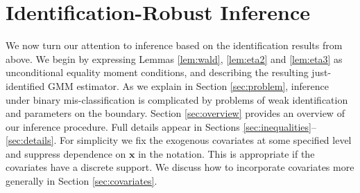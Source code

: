 \section{Identification-Robust Inference}
\label{sec:inference}
We now turn our attention to inference based on the identification results from above.
We begin by expressing Lemmas \ref{lem:wald}, \ref{lem:eta2} and \ref{lem:eta3} as unconditional equality moment conditions, and describing the resulting just-identified GMM estimator. 
As we explain in Section \ref{sec:problem}, inference under binary mis-classification is complicated by problems of weak identification and parameters on the boundary.
Section \ref{sec:overview} provides an overview of our inference procedure.
Full details appear in Sections \ref{sec:inequalities}--\ref{sec:details}.
For simplicity we fix the exogenous covariates at some specified level and suppress dependence on $\mathbf{x}$ in the notation.
This is appropriate if the covariates have a discrete support.
We discuss how to incorporate covariates more generally in Section \ref{sec:covariates}.

